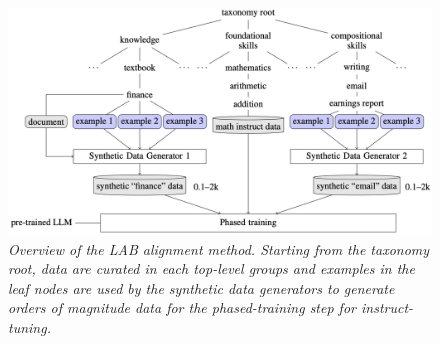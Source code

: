 \documentclass[12pt]{article}
\begin{document}
\begin{figure}
    \centering
    \includegraphics[width=1\textwidth]{img/figure1.png}
    \caption{\textit{Overview of the LAB alignment method. Starting from the taxonomy root, data are curated in each top-level groups and examples in the leaf nodes are used by the synthetic data generators to generate orders of magnitude data for the phased-training step for instruct-tuning.}}
    \label{fig:ilab}
\end{figure}
\end{document}

